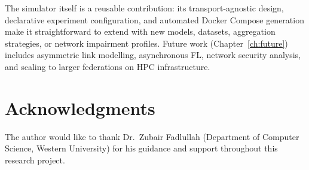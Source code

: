 \documentclass[12pt,a4paper]{report}
\begin{document}
The simulator itself is a reusable contribution: its transport-agnostic
design, declarative experiment configuration, and automated Docker
Compose generation make it straightforward to extend with new models,
datasets, aggregation strategies, or network impairment profiles.  Future
work (Chapter~\ref{ch:future}) includes asymmetric link modelling,
asynchronous FL, network security analysis, and scaling to larger
federations on HPC infrastructure.

\chapter*{Acknowledgments}

The author would like to thank Dr.\ Zubair Fadlullah (Department of
Computer Science, Western University) for his guidance and support
throughout this research project.



\end{document}
